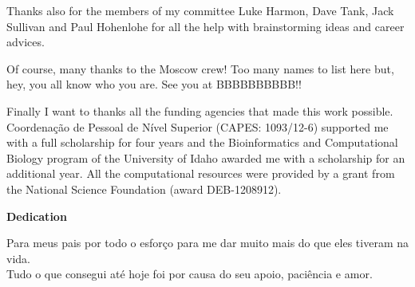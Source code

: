 Thanks also for the members of my committee Luke Harmon, Dave Tank, Jack Sullivan and Paul Hohenlohe for all the help with brainstorming ideas and career advices.

Of course, many thanks to the Moscow crew! Too many names to list here but, hey, you all know who you are. See you at BBBBBBBBBB!!

Finally I want to thanks all the funding agencies that made this work possible. Coordenação de Pessoal de Nível Superior (CAPES: 1093/12-6) supported me with a full scholarship for four years and the Bioinformatics and Computational Biology program of the University of Idaho awarded me with a scholarship for an additional year. All the computational resources were provided by a grant from the National Science Foundation (award DEB-1208912).

\pagebreak

\vspace*{\fill} %
\begin{center} %

\begin{large}
\textbf{Dedication} \\
\end{large}
\indent Para meus pais por todo o esforço para me dar muito mais do que eles tiveram na vida. \\
\indent Tudo o que consegui até hoje foi por causa do seu apoio, paciência e amor.

\end{center}
\vspace*{\fill}
\pagebreak

\tableofcontents
\pagebreak

\listoftables
\pagebreak

\listoffigures
\pagebreak